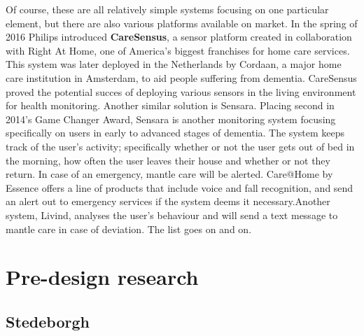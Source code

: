 \documentclass{below-ext}
\begin{document}
Of course, these are all relatively simple systems focusing on one particular element, but there are also various platforms available on market. In the spring of 2016 Philips introduced \textbf{CareSensus}, a sensor platform created in collaboration with Right At Home, one of America's biggest franchises for  home care services. This system was later deployed in the Netherlands by Cordaan, a major home care institution in Amsterdam, to aid people suffering from dementia. CareSensus proved the potential succes of deploying various sensors in the living environment for health monitoring. Another similar solution is Sensara. Placing second in 2014's Game Changer Award, Sensara is another monitoring system focusing specifically on users in early to advanced stages of dementia. The system keeps track of the user's activity; specifically whether or not the user gets out of bed in the morning, how often the user leaves their house and whether or not they return. In case of an emergency, mantle care will be alerted. Care@Home by Essence offers a line of products that include voice and fall recognition, and send an alert out to emergency services if the system deems it necessary.Another system, Livind, analyses the user's behaviour and will send a text message to mantle care in case of deviation. The list goes on and on.  




\section{Pre-design research}

\subsection{Stedeborgh}
\end{document}
